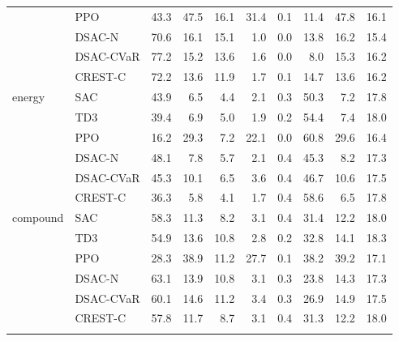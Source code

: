 \begin{table}[tb]
\begin{tabular}{llrrrrrrrr}
 & PPO & 43.3 & 47.5 & 16.1 & 31.4 & 0.1 & 11.4 & 47.8 & 16.1 \\
 & DSAC-N & 70.6 & 16.1 & 15.1 & 1.0 & 0.0 & 13.8 & 16.2 & 15.4 \\
 & DSAC-CVaR & 77.2 & 15.2 & 13.6 & 1.6 & 0.0 & 8.0 & 15.3 & 16.2 \\
 & CREST-C & 72.2 & 13.6 & 11.9 & 1.7 & 0.1 & 14.7 & 13.6 & 16.2 \\
\addlinespace[2pt]
energy & SAC & 43.9 & 6.5 & 4.4 & 2.1 & 0.3 & 50.3 & 7.2 & 17.8 \\
 & TD3 & 39.4 & 6.9 & 5.0 & 1.9 & 0.2 & 54.4 & 7.4 & 18.0 \\
 & PPO & 16.2 & 29.3 & 7.2 & 22.1 & 0.0 & 60.8 & 29.6 & 16.4 \\
 & DSAC-N & 48.1 & 7.8 & 5.7 & 2.1 & 0.4 & 45.3 & 8.2 & 17.3 \\
 & DSAC-CVaR & 45.3 & 10.1 & 6.5 & 3.6 & 0.4 & 46.7 & 10.6 & 17.5 \\
 & CREST-C & 36.3 & 5.8 & 4.1 & 1.7 & 0.4 & 58.6 & 6.5 & 17.8 \\
\addlinespace[2pt]
compound & SAC & 58.3 & 11.3 & 8.2 & 3.1 & 0.4 & 31.4 & 12.2 & 18.0 \\
 & TD3 & 54.9 & 13.6 & 10.8 & 2.8 & 0.2 & 32.8 & 14.1 & 18.3 \\
 & PPO & 28.3 & 38.9 & 11.2 & 27.7 & 0.1 & 38.2 & 39.2 & 17.1 \\
 & DSAC-N & 63.1 & 13.9 & 10.8 & 3.1 & 0.3 & 23.8 & 14.3 & 17.3 \\
 & DSAC-CVaR & 60.1 & 14.6 & 11.2 & 3.4 & 0.3 & 26.9 & 14.9 & 17.5 \\
 & CREST-C & 57.8 & 11.7 & 8.7 & 3.1 & 0.4 & 31.3 & 12.2 & 18.0 \\
\addlinespace[2pt]
\bottomrule
\end{tabular}
\end{table}